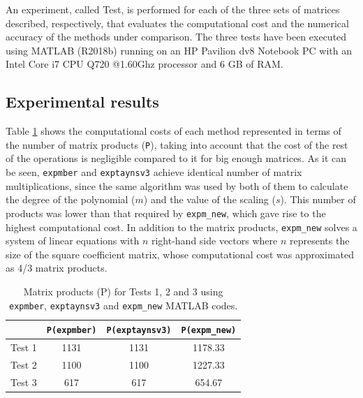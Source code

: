 \documentclass[preprint,10pt,numbers,sort&compress]{elsarticle}
\begin{document}
An experiment, called Test, is performed for each of the three sets of matrices described, respectively, 
that evaluates the computational cost and the numerical accuracy of the methods under comparison. 
The three tests have been executed using MATLAB (R2018b) running on an HP Pavilion dv8 Notebook PC with an Intel Core i7 CPU Q720 @1.60Ghz processor and 6 GB of RAM. 

\subsection{Experimental results}

Table \ref{table_prod_comparative} shows the computational costs of each method represented in terms of the number of matrix products (\texttt{P}), taking into account that the cost of the rest of the operations is negligible compared to it for big enough matrices. As it can be seen, \texttt{expmber} and \texttt{exptaynsv3} achieve identical number of matrix multiplications, since the same algorithm was used by both of them to calculate the degree of the polynomial ($m$) and the value of the scaling ($s$). This number of products was lower than that required by \texttt{expm\_new}, which gave rise to the highest computational cost. In addition to the matrix products, \texttt{expm\_new} solves a system of linear equations with $n$ right-hand side vectors where $n$ represents the size of the square coefficient matrix, whose computational cost was approximated as 4/3 matrix products.

\begin{table}[!t]\begin{center}
        \caption{Matrix products (P) for  Tests 1, 2 and 3 using \texttt{expmber}, \texttt{exptaynsv3}
and \texttt{expm\_new} MATLAB codes.}
{\footnotesize
        \begin{tabular}{|c||c|c|c|}\hline&\texttt{P(expmber)}&\texttt{P(exptaynsv3)}&\texttt{P(expm\_new)}\\\hline
            Test 1 & 1131 & 1131 & 1178.33 \\\hline
            Test 2 & 1100 & 1100 & 1227.33 \\\hline
            Test 3 & 617  & 617  & 654.67 \\\hline
        \end{tabular}
}
        \label{table_prod_comparative}
    \end{center}
\end{table} 
\end{document}
